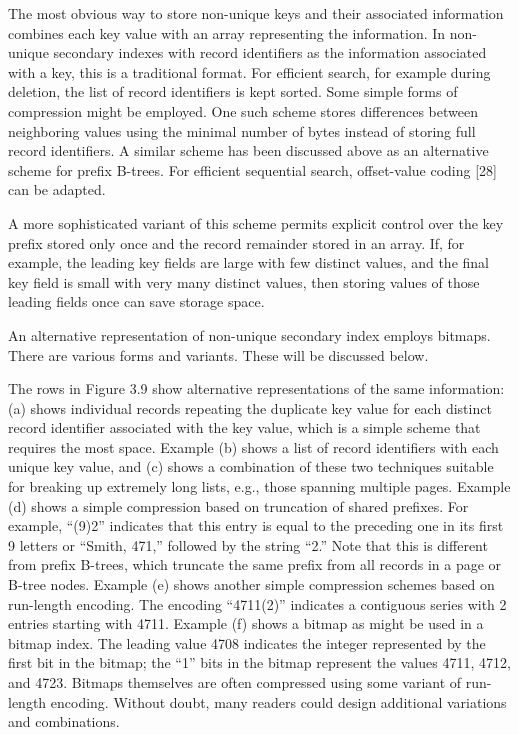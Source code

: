The most obvious way to store non-unique keys and their associated
information combines each key value with an array representing the
information. In non-unique secondary indexes with record identifiers as
the information associated with a key, this is a traditional format. For
efficient search, for example during deletion, the list of record
identifiers is kept sorted. Some simple forms of compression might be
employed. One such scheme stores differences between neighboring values
using the minimal number of bytes instead of storing full record
identifiers. A similar scheme has been discussed above as an alternative
scheme for prefix B-trees. For efficient sequential search, offset-value
coding {[}28{]} can be adapted.

A more sophisticated variant of this scheme permits explicit control
over the key prefix stored only once and the record remainder stored in
an array. If, for example, the leading key fields are large with few
distinct values, and the final key field is small with very many
distinct values, then storing values of those leading fields once can
save storage space.

An alternative representation of non-unique secondary index employs
bitmaps. There are various forms and variants. These will be discussed
below.

The rows in Figure 3.9 show alternative representations of the same
information: (a) shows individual records repeating the duplicate key
value for each distinct record identifier associated with the key value,
which is a simple scheme that requires the most space. Example (b) shows
a list of record identifiers with each unique key value, and (c) shows a
combination of these two techniques suitable for breaking up extremely
long lists, e.g., those spanning multiple pages. Example (d) shows a
simple compression based on truncation of shared prefixes. For example,
``(9)2'' indicates that this entry is equal to the preceding one in its
first 9 letters or ``Smith, 471,'' followed by the string ``2.'' Note
that this is different from prefix B-trees, which truncate the same
prefix from all records in a page or B-tree nodes. Example (e) shows
another simple compression schemes based on run-length encoding. The
encoding ``4711(2)'' indicates a contiguous series with 2 entries
starting with 4711. Example (f) shows a bitmap as might be used in a
bitmap index. The leading value 4708 indicates the integer represented
by the first bit in the bitmap; the ``1'' bits in the bitmap represent
the values 4711, 4712, and 4723. Bitmaps themselves are often compressed
using some variant of run-length encoding. Without doubt, many readers
could design additional variations and combinations.

